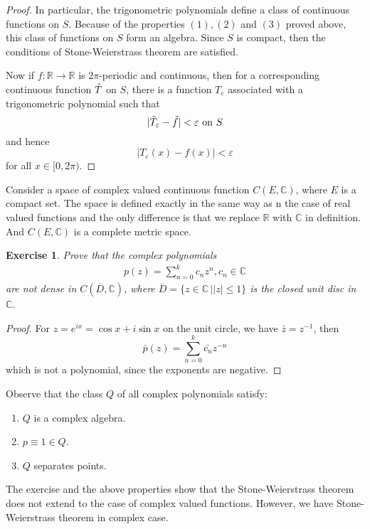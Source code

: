 \documentclass[12pt,leqno]{amsart}
\newtheorem{exercise}{Exercise}[section]
\theoremstyle{definition}
\numberwithin{equation}{subsection}
\begin{document}
\begin{proof}
In particular, the trigonometric polynomials define a class of continuous functions on $S$. Because of the properties $(1),(2)$ and $(3)$ proved above, this class of functions on $S$ form an algebra. Since $S$ is compact, then the conditions of Stone-Weierstrass theorem are satisfied. 

Now if $f:\mathbb{R}\to\mathbb{R}$ is $2\pi$-periodic and continuous, then for a corresponding continuous function $\Tilde{T}$ on $S$, there is a function $T_\varepsilon$ associated with a trigonometric polynomial such that 
$$|\Tilde{T}_\varepsilon - \Tilde{f}| < \varepsilon \,\, \text{on} \,\, S$$
and hence 
$$|T_\varepsilon(x) - f(x)| < \varepsilon$$
for all $x\in[0,2\pi)$.
\end{proof}

\medskip

Consider a space of complex valued continuous function $C(E,\mathbb{C})$, where $E$ is a compact set. The space is defined exactly in the same way as n the case of real valued functions and the only difference is that we replace $\mathbb{R}$ with $\mathbb{C}$ in definition. And $C(E,\mathbb{C})$ is a complete metric space. 

\begin{exercise}
Prove that the complex polynomials 
\begin{align*}
    p(z) = \sum^k_{n=0}c_n z^n, c_n\in\mathbb{C}
\end{align*}
are not dense in $C(\overline{D},\mathbb{C})$, where $\overline{D} = \{z\in \mathbb{C} \,| \left|z\right|\leq 1\}$ is the closed unit disc in $\mathbb{C}$.
\end{exercise}
\begin{proof}
For $z = e^{ix} = \cos x + i\sin x$ on the unit circle, we have $\bar{z} = z^{-1}$, then $$\bar{p}(z) = \sum^k_{n=0}\bar{c_n} z^{-n}$$
which is not a polynomial, since the exponents are negative.
\end{proof}

Observe that the class $Q$ of all complex polynomials satisfy:
\begin{enumerate}
    \item $Q$ is a complex algebra.
    \item $p\equiv 1 \in Q$.
    \item $Q$ separates points.
\end{enumerate}
The exercise and the above properties show that the Stone-Weierstrass theorem does not extend to the case of complex valued functions. However, we have Stone-Weierstrass theorem in complex case.
\end{document}
